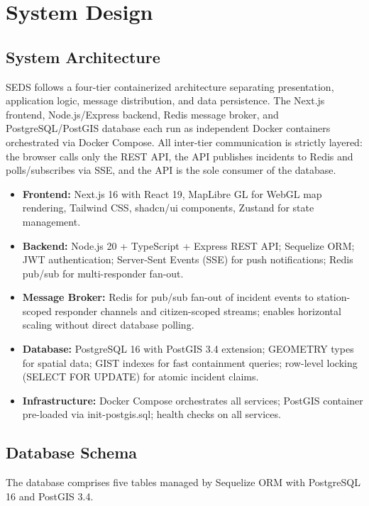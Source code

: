 \chapter{System Design}

\section{System Architecture}

SEDS follows a four-tier containerized architecture separating presentation, application logic, message distribution, and data persistence. The Next.js frontend, Node.js/Express backend, Redis message broker, and PostgreSQL/PostGIS database each run as independent Docker containers orchestrated via Docker Compose. All inter-tier communication is strictly layered: the browser calls only the REST API, the API publishes incidents to Redis and polls/subscribes via SSE, and the API is the sole consumer of the database.

\begin{itemize}
  \item \textbf{Frontend:} Next.js 16 with React 19, MapLibre GL for WebGL map rendering, Tailwind CSS, shadcn/ui components, Zustand for state management.
  \item \textbf{Backend:} Node.js 20 + TypeScript + Express REST API; Sequelize ORM; JWT authentication; Server-Sent Events (SSE) for push notifications; Redis pub/sub for multi-responder fan-out.
  \item \textbf{Message Broker:} Redis for pub/sub fan-out of incident events to station-scoped responder channels and citizen-scoped streams; enables horizontal scaling without direct database polling.
  \item \textbf{Database:} PostgreSQL 16 with PostGIS 3.4 extension; GEOMETRY types for spatial data; GIST indexes for fast containment queries; row-level locking (SELECT FOR UPDATE) for atomic incident claims.
  \item \textbf{Infrastructure:} Docker Compose orchestrates all services; PostGIS container pre-loaded via init-postgis.sql; health checks on all services.
\end{itemize}

\section{Database Schema}

The database comprises five tables managed by Sequelize ORM with PostgreSQL 16 and PostGIS 3.4.

